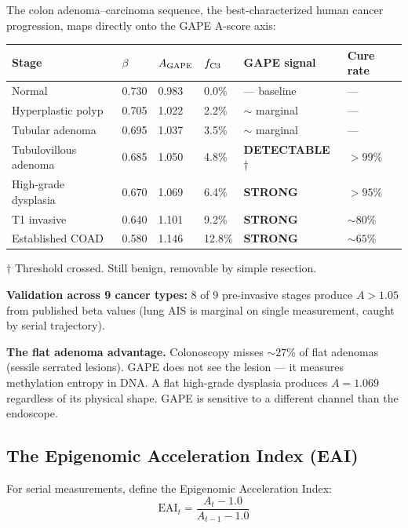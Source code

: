 \documentclass[12pt,a4paper]{article}
\begin{document}
\noindent The colon adenoma--carcinoma sequence, the best-characterized human
cancer progression, maps directly onto the GAPE A-score axis:

\begin{center}
\renewcommand{\arraystretch}{1.2}
\begin{tabular}{llllll}
\toprule
\textbf{Stage} & $\beta$ & $A_{\rm GAPE}$ & $f_{\rm C3}$ &
\textbf{GAPE signal} & \textbf{Cure rate} \\
\midrule
Normal          & 0.730 & 0.983 & 0.0\% & — baseline & — \\
Hyperplastic polyp & 0.705 & 1.022 & 2.2\% & $\sim$ marginal & — \\
Tubular adenoma & 0.695 & 1.037 & 3.5\% & $\sim$ marginal & — \\
Tubulovillous adenoma & 0.685 & 1.050 & 4.8\% & \textbf{DETECTABLE} $\dagger$ & $>99\%$ \\
High-grade dysplasia & 0.670 & 1.069 & 6.4\% & \textbf{STRONG} & $>95\%$ \\
T1 invasive & 0.640 & 1.101 & 9.2\% & \textbf{STRONG} & $\sim 80\%$ \\
Established COAD & 0.580 & 1.146 & 12.8\% & \textbf{STRONG} & $\sim 65\%$ \\
\bottomrule
\end{tabular}
\end{center}
$\dagger$ Threshold crossed. Still benign, removable by simple resection.

\noindent \textbf{Validation across 9 cancer types:} 8 of 9 pre-invasive stages
produce $A > 1.05$ from published beta values (lung AIS is marginal on
single measurement, caught by serial trajectory).

\noindent \textbf{The flat adenoma advantage.} Colonoscopy misses $\sim 27\%$
of flat adenomas (sessile serrated lesions). GAPE does not see the lesion ---
it measures methylation entropy in DNA. A flat high-grade dysplasia
produces $A = 1.069$ regardless of its physical shape.
GAPE is sensitive to a different channel than the endoscope.

\subsection{The Epigenomic Acceleration Index (EAI)}
\label{subsec:eai}

For serial measurements, define the Epigenomic Acceleration Index:
\begin{equation}
\text{EAI}_t = \frac{A_t - 1.0}{A_{t-1} - 1.0}
\end{equation}
\end{document}
